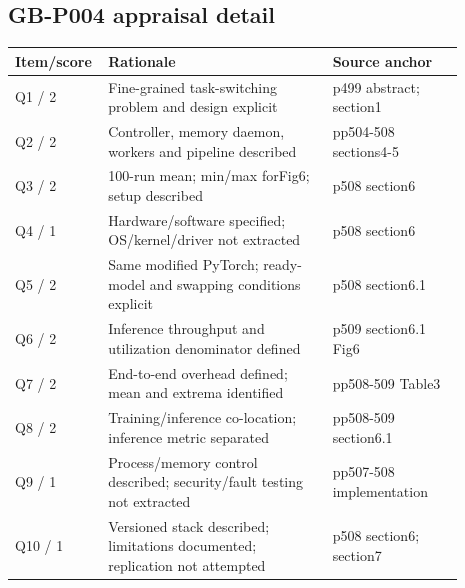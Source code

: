 \documentclass[12pt,a4paper]{article}
\begin{document}
\subsection{GB-P004 appraisal detail}
\begin{longtable}{p{0.13\linewidth}p{0.48\linewidth}p{0.28\linewidth}}
\toprule
Item/\allowbreak{}score & Rationale & Source anchor\\\midrule
\endhead
Q1 /\allowbreak{} 2 & Fine-grained task-switching problem and design explicit & p499 abstract; section1\\
Q2 /\allowbreak{} 2 & Controller, memory daemon, workers and pipeline described & pp504-508 sections4-5\\
Q3 /\allowbreak{} 2 & 100-run mean; min/\allowbreak{}max forFig6; setup described & p508 section6\\
Q4 /\allowbreak{} 1 & Hardware/\allowbreak{}software specified; OS/\allowbreak{}kernel/\allowbreak{}driver not extracted & p508 section6\\
Q5 /\allowbreak{} 2 & Same modified PyTorch; ready-model and swapping conditions explicit & p508 section6.1\\
Q6 /\allowbreak{} 2 & Inference throughput and utilization denominator defined & p509 section6.1 Fig6\\
Q7 /\allowbreak{} 2 & End-to-end overhead defined; mean and extrema identified & pp508-509 Table3\\
Q8 /\allowbreak{} 2 & Training/\allowbreak{}inference co-location; inference metric separated & pp508-509 section6.1\\
Q9 /\allowbreak{} 1 & Process/\allowbreak{}memory control described; security/\allowbreak{}fault testing not extracted & pp507-508 implementation\\
Q10 /\allowbreak{} 1 & Versioned stack described; limitations documented; replication not attempted & p508 section6; section7\\
\bottomrule
\end{longtable}
\end{document}
